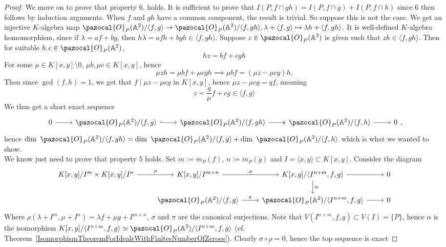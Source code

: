 \begin{proof}
        We move on to prove that property 6. holds. It is sufficient to prove that $I(P,f\cap gh)=I(P,f\cap g)+I(P,f\cap h)$ since 6 then follows by induction arguments. When $f$ and $gh$ have a common component, the result is trivial. So suppose this is not the case. We get an injective $K$-algebra map $\pazocal{O}_P(\A^2)/\langle f, g\rangle \rightarrow \pazocal{O}_P(\A^2)/\langle f,gh\rangle, \lambda + \langle f,g\rangle \mapsto \lambda h + \langle f,gh\rangle$. It is well-defined $K$-algebra homomorphism, since if $\lambda= af+bg$, then $h\lambda = afh+bgh\in \langle f,gh\rangle$. Suppose $z\in \pazocal{O}_P(\A^2)$ is given such that $zh\in \langle f, gh\rangle$. Then for suitable $b,c\in \pazocal{O}_P(\A^2)$, 
        $$hz = bf+cgh$$
        For some $\mu\in K[x,y]\setminus 0$, $\mu b,\mu c\in K[x,y]$, hence
        $$\mu zh=\mu bf+\mu cgh \implies \mu b f= (\mu z-\mu c g)h.$$
        Then since $\gcd(f,h)=1$, we get that $f\mid \mu z-\mu cg$ in $K[x,y]$, hence $\mu z-\mu cg=qf$, meaning 
        $$z = \frac{q}{\mu}f+cg\in \langle f,g\rangle$$
        We thus get a short exact sequence 
        $$\begin{tikzcd}
            0 \arrow[r] & \pazocal{O}_P(\A^2)/\langle f,g\rangle \arrow[r, hookrightarrow] & \pazocal{O}_P(\A^2)/\langle f, gh\rangle \arrow[r,twoheadrightarrow] & \pazocal{O}_P(\A^2)/\langle f,h\rangle \arrow[r] & 0 
        \end{tikzcd},$$
        hence $\dim\ \pazocal{O}_P(\A^2)/\langle f, gh\rangle= \dim \  \pazocal{O}_P(\A^2)/\langle f,g\rangle + \dim\ \pazocal{O}_P(\A^2)/\langle f,h\rangle $ which is what we wanted to show.\\
        We know just need to prove that property 5 holds. Set $m:=m_P(f)$, $n:=m_P(g)$ and $I=\langle x,y\rangle \subset K[x,y]$. Consider the diagram 
        $$\begin{tikzcd}
            K[x,y]/I^m\times K[x,y]/I^n \arrow[r, "\rho"] & K[x,y]/I^{m+n} \arrow[r, "\sigma"] & K[x,y]/\langle I^{n+m},f,g\rangle \arrow[d, "\alpha"] \arrow[r] & 0\\
             & \pazocal{O}_P(\A^2)/\langle f,g\rangle \arrow[r,"\pi"]  &\pazocal{O}_P(\A^2)/\langle I^{n+m},f,g\rangle \arrow[r] & 0
        \end{tikzcd}$$
        Where $\rho(\lambda + I^m,\mu + I^n) = \lambda f+\mu g + I^{m+n}$, $\sigma$ and $\pi$ are the canonical surjections. Note that $V(I^{n+m},f,g)\subset V(I)=\{P\}$, hence $\alpha$ is the isomorphism $K[x,y]/\langle I^{n+m},f,g\rangle \simeq \pazocal{O}_P(\A^2)/\langle I^{n+m},f,g\rangle$ (cf. Theorem~\ref{IsomorphismTheoremForIdealsWithFinitesNumberOfZeroes}). Clearly $\sigma\circ\rho=0$, hence the top sequence is exact

\end{proof}
